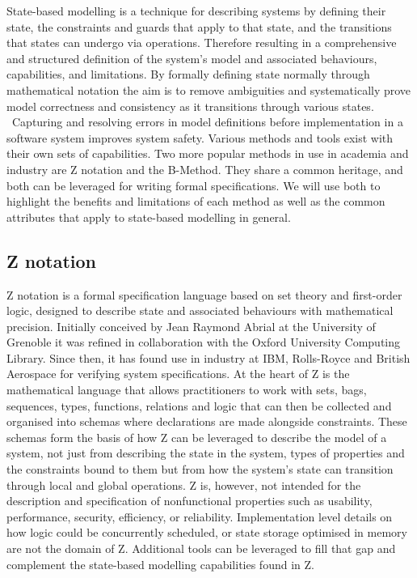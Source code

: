 \documentclass{article}
\begin{document}
State-based modelling is a technique for describing systems by defining their state, the constraints and guards that apply to that state, and the transitions that states can undergo via operations. Therefore resulting in a comprehensive and structured definition of the system's model and associated behaviours, capabilities, and limitations.
\newline \newline
By formally defining state normally through mathematical notation the aim is to remove ambiguities and systematically prove model correctness and consistency as it transitions through various states.  Capturing and resolving errors in model definitions before implementation in a software system improves system safety.
\newline \newline
Various methods and tools exist with their own sets of capabilities. Two more popular methods in use in academia and industry are Z notation and the B-Method. They share a common heritage, and both can be leveraged for writing formal specifications. We will use both to highlight the benefits and limitations of each method as well as the common attributes that apply to state-based modelling in general.

\subsection*{Z notation}

Z notation is a formal specification language based on set theory and first-order logic, designed to describe state and associated behaviours with mathematical precision. Initially conceived by Jean Raymond Abrial at the University of Grenoble it was refined in collaboration with the Oxford University Computing Library. Since then, it has found use in industry at IBM, Rolls-Royce and British Aerospace for verifying system specifications.
\newline \newline
At the heart of Z is the mathematical language that allows practitioners to work with sets, bags, sequences, types, functions, relations and logic that can then be collected and organised into schemas where declarations are made alongside constraints. These schemas form the basis of how Z can be leveraged to describe the model of a system, not just from describing the state in the system, types of properties and the constraints bound to them but from how the system’s state can transition through local and global operations.
\newline \newline
Z is, however, not intended for the description and specification of nonfunctional properties such as usability, performance, security, efficiency, or reliability. Implementation level details on how logic could be concurrently scheduled, or state storage optimised in memory are not the domain of Z. Additional tools can be leveraged to fill that gap and complement the state-based modelling capabilities found in Z.
\end{document}
